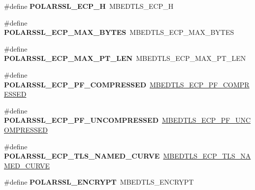 \begin{DoxyCompactItemize}
\item 
\mbox{\label{compat-1_83_8h_ac0bcb0b5f0a28e405ef97b5f3817eb88}} 
\#define {\bfseries P\+O\+L\+A\+R\+S\+S\+L\+\_\+\+E\+C\+P\+\_\+H}~M\+B\+E\+D\+T\+L\+S\+\_\+\+E\+C\+P\+\_\+H
\item 
\mbox{\label{compat-1_83_8h_a1ef9d88cd3a37a2fef0267d1dfe72510}} 
\#define {\bfseries P\+O\+L\+A\+R\+S\+S\+L\+\_\+\+E\+C\+P\+\_\+\+M\+A\+X\+\_\+\+B\+Y\+T\+ES}~M\+B\+E\+D\+T\+L\+S\+\_\+\+E\+C\+P\+\_\+\+M\+A\+X\+\_\+\+B\+Y\+T\+ES
\item 
\mbox{\label{compat-1_83_8h_a7c7d2c178fceae9dc252cc111cd845ef}} 
\#define {\bfseries P\+O\+L\+A\+R\+S\+S\+L\+\_\+\+E\+C\+P\+\_\+\+M\+A\+X\+\_\+\+P\+T\+\_\+\+L\+EN}~M\+B\+E\+D\+T\+L\+S\+\_\+\+E\+C\+P\+\_\+\+M\+A\+X\+\_\+\+P\+T\+\_\+\+L\+EN
\item 
\mbox{\label{compat-1_83_8h_ad429f374f5b86942b9561edce9c99082}} 
\#define {\bfseries P\+O\+L\+A\+R\+S\+S\+L\+\_\+\+E\+C\+P\+\_\+\+P\+F\+\_\+\+C\+O\+M\+P\+R\+E\+S\+S\+ED}~\mbox{\hyperlink{ecp_8h_a300814dc5a3ef878a5fb34cc2f185e7a}{M\+B\+E\+D\+T\+L\+S\+\_\+\+E\+C\+P\+\_\+\+P\+F\+\_\+\+C\+O\+M\+P\+R\+E\+S\+S\+ED}}
\item 
\mbox{\label{compat-1_83_8h_ac9035f34ba62d16e0e37bdaca67e37e2}} 
\#define {\bfseries P\+O\+L\+A\+R\+S\+S\+L\+\_\+\+E\+C\+P\+\_\+\+P\+F\+\_\+\+U\+N\+C\+O\+M\+P\+R\+E\+S\+S\+ED}~\mbox{\hyperlink{ecp_8h_a076e0db0a53f09d424b8650390632bb3}{M\+B\+E\+D\+T\+L\+S\+\_\+\+E\+C\+P\+\_\+\+P\+F\+\_\+\+U\+N\+C\+O\+M\+P\+R\+E\+S\+S\+ED}}
\item 
\mbox{\label{compat-1_83_8h_a8dd54f6888aed50a45a3ba56af003553}} 
\#define {\bfseries P\+O\+L\+A\+R\+S\+S\+L\+\_\+\+E\+C\+P\+\_\+\+T\+L\+S\+\_\+\+N\+A\+M\+E\+D\+\_\+\+C\+U\+R\+VE}~\mbox{\hyperlink{ecp_8h_a5bfe061b705a8695d730dfca7d265407}{M\+B\+E\+D\+T\+L\+S\+\_\+\+E\+C\+P\+\_\+\+T\+L\+S\+\_\+\+N\+A\+M\+E\+D\+\_\+\+C\+U\+R\+VE}}
\item 
\mbox{\label{compat-1_83_8h_a4deb9f02fa4818eb421b5204e889ad74}} 
\#define {\bfseries P\+O\+L\+A\+R\+S\+S\+L\+\_\+\+E\+N\+C\+R\+Y\+PT}~M\+B\+E\+D\+T\+L\+S\+\_\+\+E\+N\+C\+R\+Y\+PT
\item 
\mbox{\label{compat-1_83_8h_a0a2ae1f118c7cc66d2974d13fc1836a5}} 

\end{DoxyCompactItemize}
